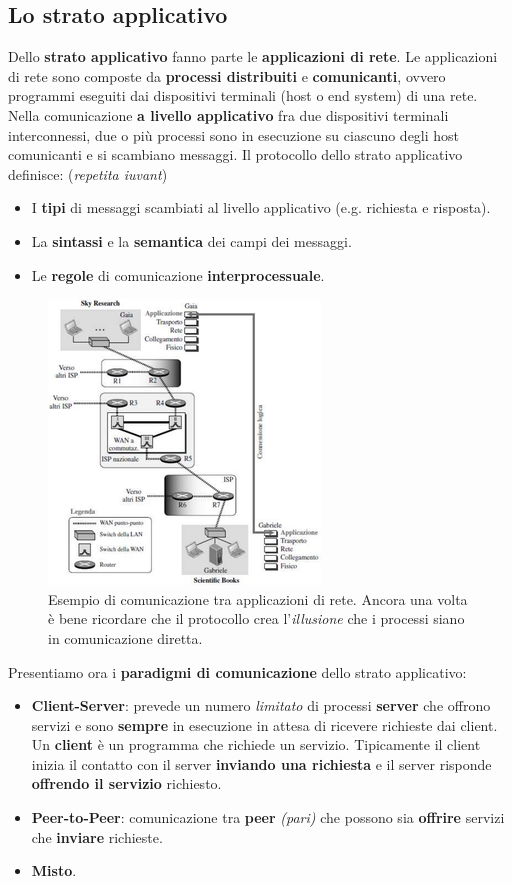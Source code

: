 \documentclass[11pt,a4paper]{article}
\theoremstyle{definition}
\begin{document}
\subsection{Lo strato applicativo}
Dello \textbf{strato applicativo} fanno parte le \textbf{applicazioni di rete}. Le applicazioni di rete sono composte da \textbf{processi distribuiti} e \textbf{comunicanti}, ovvero programmi eseguiti dai dispositivi terminali (host o end system) di una rete. Nella comunicazione \textbf{a livello applicativo} fra due dispositivi terminali interconnessi, due o più processi sono in esecuzione su ciascuno degli host comunicanti e si scambiano messaggi.
Il protocollo dello strato applicativo definisce: (\textit{repetita iuvant})
\begin{itemize}
	\item I \textbf{tipi} di messaggi scambiati al livello
	      applicativo (e.g. richiesta e risposta).
	\item La \textbf{sintassi} e la \textbf{semantica} dei campi dei messaggi.
	\item Le \textbf{regole} di comunicazione \textbf{interprocessuale}.
\end{itemize}
\begin{figure}[!h]
	\includegraphics[scale=0.63]{Immagini/Application_layer.png}
	\centering
	\caption{Esempio di comunicazione tra applicazioni di rete. Ancora una volta è bene ricordare che il protocollo crea l'\textit{illusione} che i processi siano in comunicazione diretta.}
\end{figure}
Presentiamo ora i \textbf{paradigmi di comunicazione} dello strato applicativo:
\begin{itemize}
	\item \textbf{Client-Server}: prevede un numero \textit{limitato} di processi \textbf{server} che
	      offrono servizi e sono \textbf{sempre} in esecuzione in attesa di ricevere richieste dai client. Un \textbf{client} è un programma che richiede un servizio. Tipicamente il client inizia il contatto con il server \textbf{inviando una richiesta} e il server risponde \textbf{offrendo il servizio} richiesto.
	\item \textbf{Peer-to-Peer}: comunicazione tra \textbf{peer} \textit{(pari)} che possono sia \textbf{offrire} servizi che \textbf{inviare} richieste.
	\item  \textbf{Misto}.
\end{itemize}
\end{document}
